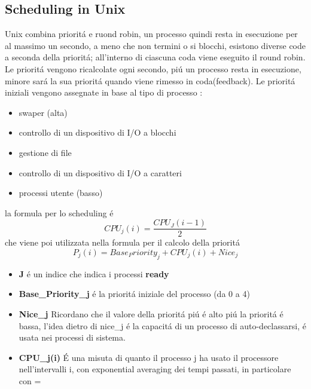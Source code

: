     \subsection{Scheduling in Unix}
    Unix combina prioritá e ruond robin, un processo quindi resta in esecuzione per al massimo un secondo, a meno che non termini
    o si blocchi, esistono diverse code a seconda della prioritá; all'interno di ciascuna coda viene eseguito il round robin.
    Le prioritá vengono ricalcolate ogni secondo, piú un processo resta in esecuzione, minore sará la sua prioritá quando
    viene rimesso in coda(feedback). Le prioritá iniziali vengono assegnate in base al tipo di processo :
    \begin{itemize}
        \item swaper (alta)
        \item controllo di un dispositivo di I/O a blocchi
        \item gestione di file
        \item controllo di un dispositivo di I/O a caratteri
        \item processi utente (basso)
    \end{itemize}
    la formula per lo scheduling é
    \begin{equation}[H]
        CPU_j(i)= \frac{CPU_J(i-1)}{2}
    \end{equation}
    che viene poi utilizzata nella formula per il calcolo della prioritá
    \begin{equation}[H]
        P_j(i) = Base_Priority_j + CPU_j(i) + Nice_j
    \end{equation}
    \begin{itemize}
        \item \textbf{J} é un indice che indica i processi \textbf{ready}
        \item \textbf{Base\_Priority\_j} é la prioritá iniziale del processo (da 0 a 4)
        \item \textbf{Nice\_j} Ricordano che il valore della prioritá piú é alto piú la prioritá é bassa, l'idea
        dietro di nice_j é la capacitá di un processo di auto-declassarsi, é usata  nei processi di sistema.
        \item \textbf{CPU\_j(i)} É una misuta di quanto il processo j ha usato il processore nell'intervalli i, con
        exponential averaging dei tempi passati, in particolare con \alpha = 
    \end{itemize}
